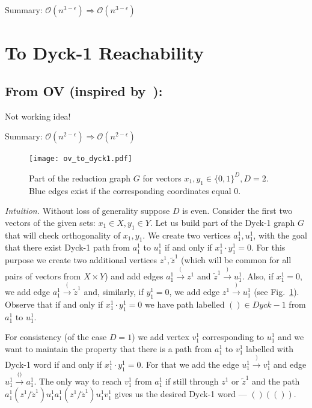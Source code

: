 \documentclass{amsart}
\begin{document}
	Summary: $\mathcal{O}(n^{3 - \epsilon}) \Rightarrow \mathcal{O}(n^{3 - \epsilon})$
	
	\section{To Dyck-1 Reachability}
	
	\subsection{From OV (inspired by~\cite{10.1145/3434315}):\\}
	\label{dyck1_to_ov}
	
	{\color{red} Not working idea!}

	Summary: $\mathcal{O}(n^{2 - \epsilon}) \Rightarrow \mathcal{O}(n^{2 - \epsilon})$
	
	\begin{figure}[!htp]
		
		\begin{center}  
			\texttt{[image: ov\_to\_dyck1.pdf]}
		\end{center}
	\label{fig:ov_to_dyck}
	
	\caption{Part of the reduction graph $G$ for vectors $x_1, y_1 \in \{0, 1\}^D, D = 2$. \\ Blue edges exist if the corresponding coordinates equal 0. }
		
	\end{figure}
	
	\emph{Intuition.} Without loss of generality suppose $D$ is even. Consider the first two vectors of the given sets: $x_1 \in X, y_1 \in Y$. Let us build part of the Dyck-1 graph $G$ that will check orthogonality of $x_1, y_1$. We create two vertices $a_1^1, u_1^1$, with the goal that there exist Dyck-1 path from $a_1^1$ to $u_1^1$ if and only if $x_1^1 \cdot y_1^1 = 0$. For this purpose we create two additional vertices $z^1, \tilde{z}^1$ (which will be common for all pairs of vectors from $X \times Y$) and add edges $a_1^1 \xrightarrow{\text{(}} z^1$ and $\tilde{z}^1 \xrightarrow{\text{)}} u_1^1$. Also, if $x_1^1 = 0$, we add edge $a_1^1 \xrightarrow{\text{(}} \tilde{z}^1$ and, similarly, if $y_1^1 = 0$, we add edge $z^1 \xrightarrow{\text{)}} u_1^1$ (see Fig.~\ref{fig:ov_to_dyck}). Observe that if and only if $x_1^1 \cdot y_1^1 = 0$ we have path labelled $() \in Dyck-1$ from $a_1^1$ to $u_1^1$.
	
	For consistency (of the case $D = 1$) we add vertex $v_1^1$ corresponding to $u_1^1$ and we want to maintain the property that there is a path from $a_1^1$ to $v_1^1$ labelled with Dyck-1 word if and only if $x_1^1 \cdot y_1^1 = 0$. For that we add the edge $u_1^1 \xrightarrow{\text{)}} v_1^1$ and edge  $u_1^1 \xrightarrow{\text{()}} a_1^1$. The only way to reach $v_1^1$ from $a_1^1$ if still through $z^1$ or $\tilde{z}^1$ and the path $a_1^1(z^1/\tilde{z}^1)u_1^1a_1^1(z^1/\tilde{z}^1)u_1^1v_1^1$ gives us the desired Dyck-1 word --- $()(())$.
	
\end{document}
